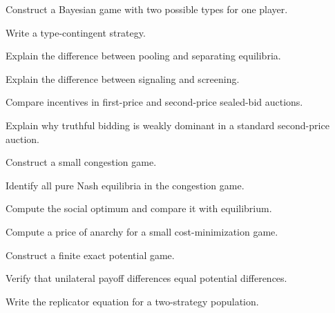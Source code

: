 \begin{exercise}[3]
Construct a Bayesian game with two possible types for one player.
\end{exercise}

\begin{exercise}[3]
Write a type-contingent strategy.
\end{exercise}

\begin{exercise}[3]
Explain the difference between pooling and separating equilibria.
\end{exercise}

\begin{exercise}[3]
Explain the difference between signaling and screening.
\end{exercise}

\begin{exercise}[3]
Compare incentives in first-price and second-price sealed-bid auctions.
\end{exercise}

\begin{exercise}[3]
Explain why truthful bidding is weakly dominant in a standard
second-price auction.
\end{exercise}

\begin{exercise}[3]
Construct a small congestion game.
\end{exercise}

\begin{exercise}[3]
Identify all pure Nash equilibria in the congestion game.
\end{exercise}

\begin{exercise}[3]
Compute the social optimum and compare it with equilibrium.
\end{exercise}

\begin{exercise}[3]
Compute a price of anarchy for a small cost-minimization game.
\end{exercise}

\begin{exercise}[3]
Construct a finite exact potential game.
\end{exercise}

\begin{exercise}[3]
Verify that unilateral payoff differences equal potential differences.
\end{exercise}

\begin{exercise}[3]
Write the replicator equation for a two-strategy population.
\end{exercise}

